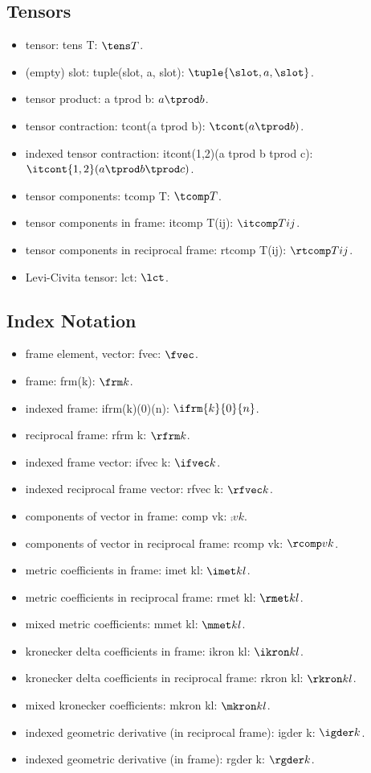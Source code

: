 \begin{multicols}{2}
\subsection{Tensors}
\begin{itemize}
\item tensor: tens T: $\tens T$.
\item (empty) slot: tuple(slot, a, slot): $\tuple{\slot, a, \slot}$.
\item tensor product: a tprod b: $a\tprod b$.
\item tensor contraction: tcont(a tprod b): $\tcont(a \tprod b)$.
\item indexed tensor contraction: itcont(1,2)(a tprod b tprod c): $\itcont{1,2}(a \tprod b \tprod c)$.
\item tensor components: tcomp T: $\tcomp T$.
\item tensor components in frame: itcomp T(ij): $\itcomp T{ij}$.
\item tensor components in reciprocal frame: rtcomp T(ij): $\rtcomp T{ij}$.
\item Levi-Civita tensor: lct: $\lct$.
\end{itemize}


\subsection{Index Notation}
\begin{itemize}
\item frame element, vector: fvec: $\fvec$.
\item frame: frm(k): $\frm k$.
\item indexed frame: ifrm(k)(0)(n): $\ifrm{k}{0}{n}$.
\item reciprocal frame: rfrm k: $\rfrm k$.
\item indexed frame vector: ifvec k: $\ifvec k$.
\item indexed reciprocal frame vector: rfvec k: $\rfvec k$.
\item components of vector in frame: comp vk: $\comp vk$.
\item components of vector in reciprocal frame: rcomp vk: $\rcomp vk$.
\item metric coefficients in frame: imet kl: $\imet kl$.
\item metric coefficients in reciprocal frame: rmet kl: $\rmet kl$.
\item mixed metric coefficients: mmet kl: $\mmet kl$.
\item kronecker delta coefficients in frame: ikron kl: $\ikron kl$.
\item kronecker delta coefficients in reciprocal frame: rkron kl: $\rkron kl$.
\item mixed kronecker coefficients: mkron kl: $\mkron kl$.
\item indexed geometric derivative (in reciprocal frame): igder k: $\igder k$.
\item indexed geometric derivative (in frame): rgder k: $\rgder k$.
\end{itemize}



\end{multicols}
